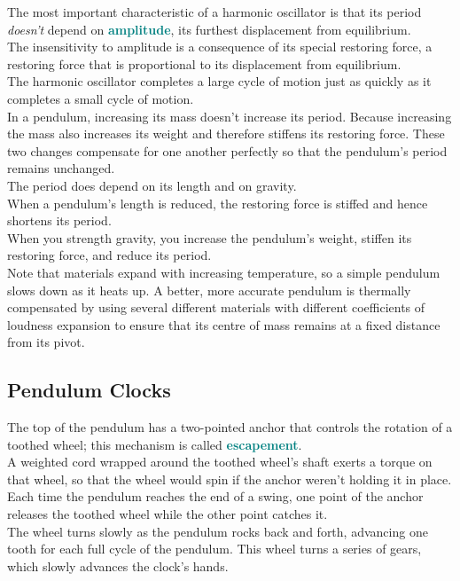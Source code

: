 \documentclass[12pt]{article}
\theoremstyle{definition}
\newcommand{\defnterm}[1]{\textbf{\textcolor{teal}{#1}}\index{#1}}
\begin{document}
The most important characteristic of a harmonic oscillator is that its period \emph{doesn't} depend on \defnterm{amplitude}, its furthest displacement from equilibrium. \\
The insensitivity to amplitude is a consequence of its special restoring force, a restoring force that is proportional to its displacement from equilibrium. \\
The harmonic oscillator completes a large cycle of motion just as quickly as it completes a small cycle of motion. \\

In a pendulum, increasing its mass doesn't increase its period.
Because increasing the mass also increases its weight and therefore stiffens its restoring force.
These two changes compensate for one another perfectly so that the pendulum's period remains unchanged. \\
The period does depend on its length and on gravity. \\
When a pendulum's length is reduced, the restoring force is stiffed and hence shortens its period.\\
When you strength gravity, you increase the pendulum's weight, stiffen its restoring force, and reduce its period. \\
Note that materials expand with increasing temperature, so a simple pendulum slows down as it heats up.
A better, more accurate pendulum is thermally compensated by using several different materials with different coefficients of loudness expansion to ensure that its centre of mass remains at a fixed distance from its pivot.

\subsection{Pendulum Clocks}
The top of the pendulum has a two-pointed anchor that controls the rotation of a toothed wheel;
this mechanism is called \defnterm{escapement}. \\
A weighted cord wrapped around the toothed wheel's shaft exerts a torque on that wheel, so that the wheel would spin if the anchor weren't holding it in place. \\
Each time the pendulum reaches the end of a swing, one point of the anchor releases the toothed wheel while the other point catches it. \\
The wheel turns slowly as the pendulum rocks back and forth, advancing one tooth for each full cycle of the pendulum.
This wheel turns a series of gears, which slowly advances the clock's hands. \\
\end{document}
